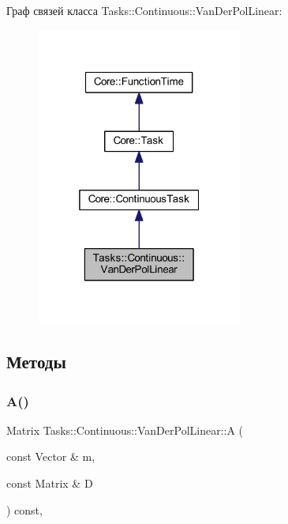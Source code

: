 Граф связей класса Tasks\+:\+:Continuous\+:\+:Van\+Der\+Pol\+Linear\+:
\nopagebreak
\begin{figure}[H]
\begin{center}
\leavevmode
\includegraphics[width=193pt]{class_tasks_1_1_continuous_1_1_van_der_pol_linear__coll__graph}
\end{center}
\end{figure}


\subsection{Методы}
\hypertarget{class_tasks_1_1_continuous_1_1_van_der_pol_linear_a2eefb5fca01c3517c44d2683032fda9d}{}\label{class_tasks_1_1_continuous_1_1_van_der_pol_linear_a2eefb5fca01c3517c44d2683032fda9d} 
\subsubsection{\texorpdfstring{A()}{A()}}
{\footnotesize\ttfamily Matrix Tasks\+::\+Continuous\+::\+Van\+Der\+Pol\+Linear\+::A (\begin{DoxyParamCaption}\item[{const Vector \&}]{m,  }\item[{const Matrix \&}]{D }\end{DoxyParamCaption}) const\hspace{0.3cm}{\ttfamily [override]}, {\ttfamily [virtual]}}



